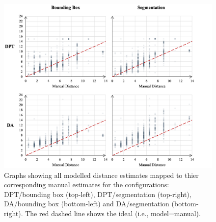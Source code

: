 \begin{figure}[p]
    \centering
    \includegraphics[width=1.01\textwidth]{body/analysis/assets/distance_graphs/spread}
    \caption{Graphs showing all modelled distance estimates mapped to thier corresponding manual
        estimates for the configurations: DPT/bounding box (top-left), DPT/segmentation (top-right),
        DA/bounding box (bottom-left) and DA/segmentation (bottom-right). The red dashed line shows
        the ideal (i.e., model=manual).}
    \label{fig:spread_comparison}
\end{figure}

\clearpage


